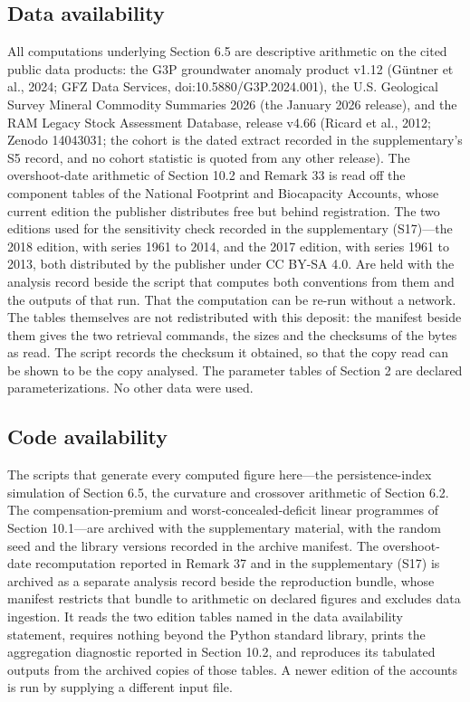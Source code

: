 \documentclass[11pt]{article}
\begin{document}
\subsection*{Data availability}

All computations underlying Section 6.5 are descriptive arithmetic on the cited public data products: the G3P groundwater anomaly product v1.12 (G\"untner et al., 2024; GFZ Data Services, doi:10.5880/\allowbreak{}G3P.2024.001), the U.S. Geological Survey Mineral Commodity Summaries 2026 (the January 2026 release), and the RAM Legacy Stock Assessment Database, release v4.66 (Ricard et al., 2012; Zenodo 14043031; the cohort is the dated extract recorded in the supplementary's S5 record, and no cohort statistic is quoted from any other release). The overshoot-date arithmetic of Section 10.2 and Remark 33 is read off the component tables of the National Footprint and Biocapacity Accounts, whose current edition the publisher distributes free but behind registration. The two editions used for the sensitivity check recorded in the supplementary (S17)---the 2018 edition, with series 1961 to 2014, and the 2017 edition, with series 1961 to 2013, both distributed by the publisher under CC BY-SA 4.0. Are held with the analysis record beside the script that computes both conventions from them and the outputs of that run. That the computation can be re-run without a network. The tables themselves are not redistributed with this deposit: the manifest beside them gives the two retrieval commands, the sizes and the checksums of the bytes as read. The script records the checksum it obtained, so that the copy read can be shown to be the copy analysed. The parameter tables of Section 2 are declared parameterizations. No other data were used.

\subsection*{Code availability} The scripts that generate every computed figure here---the persistence-index simulation of Section 6.5, the curvature and crossover arithmetic of Section 6.2. The compensation-premium and worst-concealed-deficit linear programmes of Section 10.1---are archived with the supplementary material, with the random seed and the library versions recorded in the archive manifest. The overshoot-date recomputation reported in Remark 37 and in the supplementary (S17) is archived as a separate analysis record beside the reproduction bundle, whose manifest restricts that bundle to arithmetic on declared figures and excludes data ingestion. It reads the two edition tables named in the data availability statement, requires nothing beyond the Python standard library, prints the aggregation diagnostic reported in Section 10.2, and reproduces its tabulated outputs from the archived copies of those tables. A newer edition of the accounts is run by supplying a different input file.
\end{document}
